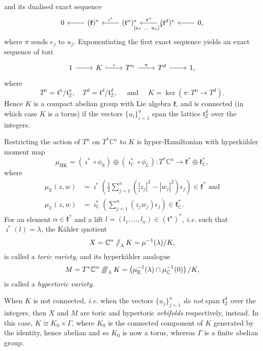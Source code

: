 \documentclass{amsart}
\newcommand{\ie}{\emph{i.e.} }
\newcommand{\ra}{\rightarrow}
\newcommand{\e}{\epsilon}
\newcommand{\RR}{\mathbb{R}}
\newcommand{\CC}{\mathbb{C}}
\newcommand{\ZZ}{\mathbb{Z}}
\newcommand{\mfk}{\mathfrak{k}}
\newcommand{\mft}{\mathfrak{t}}
\newcommand{\sslash}{\mathbin{/\mkern-6mu/}}
\newcommand{\sssslash}{\mathbin{/\mkern-6mu/\mkern-6mu/\mkern-6mu/}}
\newcommand{\tuple}[2]{(#1, \ldots, #2)}
\newcommand{\half}{\frac{1}{2}}
\DeclareMathOperator{\HK}{HK}
\begin{document}
	and its dualised exact sequence
	\[
		\begin{tikzcd}[ampersand replacement=\&]
			0 \& \ar[l]	(\mfk)^{\ast} \& \ar[l, "\imath^{\ast}", swap] (\mft^{n})^{\ast} \& \arrow{l}{[u_{1}\ \ldots \ u_{n}]^{T}}[swap]{\pi^{\ast}} (\mft^{d})^{\ast} \& \ar[l] 0,
		\end{tikzcd}
	\]
	where $\pi$ sends $e_{j}$ to $u_{j}$. Exponentiating the first exact sequence yields an exact sequence of tori
	\[
		\begin{tikzcd}[ampersand replacement=\&]
			1 \ar[r] \&	K \ar[r, hook, "\imath"] \& T^{n} \arrow{r}{\pi} \& T^{d} \ar[r] \& 1,
		\end{tikzcd}
	\]
	where 
	\[
		T^{n} = \mft^{n}/\mft_{\ZZ}^{n}, \quad T^{d} = \mft^{d}/\mft_{\ZZ}^{d}, \quad \text{ and } \quad K = \ker(\pi : T^{n} \ra T^{d}).
	\]
	Hence $K$ is a compact abelian group with Lie algebra $\mfk$, and is connected (in which case $K$ is a torus) if the vectors $\{u_{i}\}_{i=1}^{n}$ span the lattice $\mft_{\ZZ}^{d}$ over the integers.
	
	Restricting the action of $T^{n}$ on $T^{\ast}\CC^{n}$ to $K$ is hyper-Hamiltonian with hyperk\"ahler moment map
	\[
		\mu_{\HK} = (\imath^{\ast} \circ \phi_{\RR}) \oplus (\imath_{\CC}^{\ast} \circ \phi_{\CC}) : T^{\ast}\CC^{n} \ra \mfk^{\ast} \oplus \mfk_{\CC}^{\ast},
	\]
	where
	\begin{align*}%
		\mu_{\RR}(z,w) &= \imath^{\ast}\left( \half \sum_{j=1}^{n}(|z_{j}|^{2} - |w_{j}|^{2})\e_{j} \right) \in \mfk^{\ast}
		\mbox{ and}\\
		\mu_{\CC}(z,w) &= \imath_{\CC}^{\ast} \left(\sum_{j=1}^{n}(z_{j}w_{j})\e_{j} \right) \in \mfk_{\CC}^{\ast}.
	\end{align*}
	For an element $\alpha\in \mfk^{\ast}$ and a lift $l = \tuple{l_{1}}{l_{n}} \in (\mft^{n})^{\ast}$, \ie such that $\imath^{\ast}(l) = \lambda$, the K\"ahler quotient
	\[
		X = \CC^{n} \sslash_{\lambda} K = \mu^{-1}(\lambda)/K,
	\]
	is called a \emph{toric variety}, and its hyperk\"ahler analogue
	\[
		M = T^{\ast}\CC^{n} \sssslash_{\lambda} K = \left(\mu_{\RR}^{-1}(\lambda) \cap \mu_{\CC}^{-1}(0)\right)/ K,
	\]
	is called a \emph{hypertoric variety}.
	
	When $K$ is not connected, \ie when the vectors $\{u_{j}\}_{j=1}^{n}$ \emph{do not} span $\mft_{\ZZ}^{d}$ over the integers, then $X$ and $M$ are toric and hypertoric \emph{orbifolds} respectively, instead. In this case, $K \cong K_{0} \times \Gamma$, where $K_{0}$ is the connected component of $K$ generated by the identity, hence abelian and so $K_{0}$ is now a torus, whereas $\Gamma$ is a finite abelian group.
	
\end{document}
